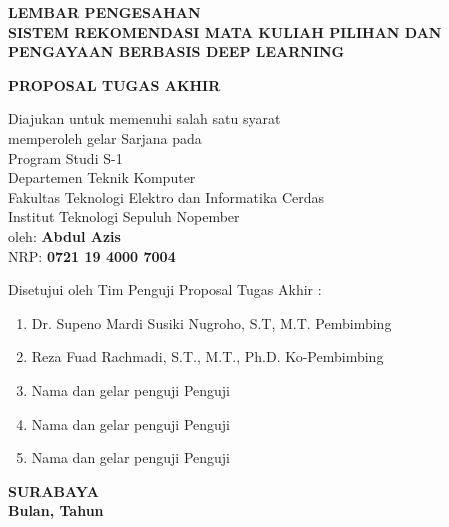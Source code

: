 \begin{center}
    \uppercase{\textbf{\large Lembar Pengesahan}} \\

    \vspace*{15mm}
    \uppercase{\textbf{Sistem rekomendasi Mata Kuliah Pilihan dan Pengayaan berbasis Deep Learning}}
    \vspace*{15mm}

    \uppercase{\textbf{Proposal Tugas Akhir}}

    \vspace*{3mm}
    Diajukan untuk memenuhi salah satu syarat          \\
    \vspace*{3mm}
    memperoleh gelar Sarjana pada                      \\
    \vspace*{3mm}
    Program Studi S-1                                  \\
    \vspace*{3mm}
    Departemen Teknik Komputer                         \\
    \vspace*{3mm}
    Fakultas Teknologi Elektro dan Informatika Cerdas  \\
    \vspace*{3mm}
    Institut Teknologi Sepuluh Nopember                \\

    \vspace*{1.5cm}
    oleh: \textbf{Abdul Azis}                          \\
    \vspace*{3mm}
    NRP: \textbf{0721 19 4000 7004}                    \\
    \vspace*{1.5cm}

    Disetujui oleh Tim Penguji Proposal Tugas Akhir :  \\
    \vspace*{5mm}

    \begin{enumerate}
        \setlength\itemsep{1.5em}
        \item Dr. Supeno Mardi Susiki Nugroho, S.T, M.T. \hfill Pembimbing
        \item Reza Fuad Rachmadi, S.T., M.T., Ph.D. \hfill Ko-Pembimbing
        \item Nama dan gelar penguji \hfill Penguji
        \item Nama dan gelar penguji \hfill Penguji
        \item Nama dan gelar penguji \hfill Penguji
    \end{enumerate}

    \vspace*{1.5cm}
    \uppercase{\textbf{surabaya}}                      \\
    \textbf{Bulan, Tahun}                              \\

\end{center}